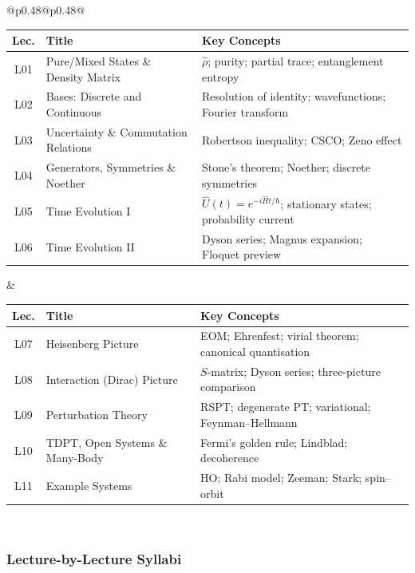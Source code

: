 \documentclass[11pt,a4paper]{article}
\begin{document}
\begin{center}
\begin{tabular}{@{}p{}@{\textwidth}p{}@{}}
\begin{tabular}[t]{@{}clp{4.2cm}@{}}
\toprule
\textbf{Lec.} & \textbf{Title} & \textbf{Key Concepts}\\
\midrule
L01 & Pure/Mixed States \& Density Matrix & $\hat\rho$; purity; partial trace; entanglement entropy\\
L02 & Bases: Discrete and Continuous & Resolution of identity; wavefunctions; Fourier transform\\
L03 & Uncertainty \& Commutation Relations & Robertson inequality; CSCO; Zeno effect\\
L04 & Generators, Symmetries \& Noether & Stone's theorem; Noether; discrete symmetries\\
L05 & Time Evolution I & $\hat{U}(t)=e^{-i\hat{H}t/\hbar}$; stationary states; probability current\\
L06 & Time Evolution II & Dyson series; Magnus expansion; Floquet preview\\
\bottomrule
\end{tabular}
&
\begin{tabular}[t]{@{}clp{4.2cm}@{}}
\toprule
\textbf{Lec.} & \textbf{Title} & \textbf{Key Concepts}\\
\midrule
L07 & Heisenberg Picture & EOM; Ehrenfest; virial theorem; canonical quantisation\\
L08 & Interaction (Dirac) Picture & $S$-matrix; Dyson series; three-picture comparison\\
L09 & Perturbation Theory & RSPT; degenerate PT; variational; Feynman--Hellmann\\
L10 & TDPT, Open Systems \& Many-Body & Fermi's golden rule; Lindblad; decoherence\\
L11 & Example Systems & HO; Rabi model; Zeeman; Stark; spin--orbit\\
\bottomrule
\end{tabular}
\\
\end{tabular}
\end{center}

\subsubsection*{Lecture-by-Lecture Syllabi}
\end{document}
